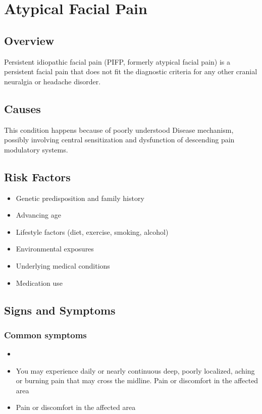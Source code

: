 \chapter{Atypical Facial Pain}
\label{sec:Atypical Facial Pain}

\section{Overview}
Persistent idiopathic facial pain (PIFP, formerly atypical facial pain) is a persistent facial pain that does not fit the diagnostic criteria for any other cranial neuralgia or headache disorder.
\section{Causes}
This condition happens because of poorly understood Disease mechanism, possibly involving central sensitization and dysfunction of descending pain modulatory systems.     
\section{Risk Factors}

\begin{itemize}[noitemsep]
  \item Genetic predisposition and family history
  \item Advancing age
  \item Lifestyle factors (diet, exercise, smoking, alcohol)
  \item Environmental exposures
  \item Underlying medical conditions
  \item Medication use
\end{itemize}
\section{Signs and Symptoms}

\subsection{Common symptoms}
\begin{itemize}[noitemsep]
  \item \item You may experience daily or nearly continuous deep, poorly localized, aching or burning pain that may cross the midline. Pain or discomfort in the affected area    \item Pain or discomfort in the affected area
  \end{itemize}

